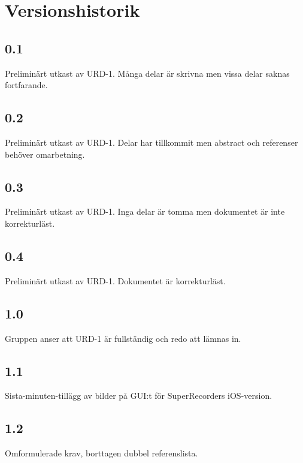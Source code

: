 \section*{Versionshistorik}

\subsection*{0.1}
Preliminärt utkast av URD-1. Många delar är skrivna men vissa delar saknas fortfarande.

\subsection*{0.2}
Preliminärt utkast av URD-1. Delar har tillkommit men abstract och referenser behöver omarbetning.

\subsection*{0.3}
Preliminärt utkast av URD-1. Inga delar är tomma men dokumentet är inte korrekturläst.

\subsection*{0.4}
Preliminärt utkast av URD-1. Dokumentet är korrekturläst.

\subsection*{1.0}
Gruppen anser att URD-1 är fullständig och redo att lämnas in.

\subsection*{1.1}
Sista-minuten-tillägg av bilder på GUI:t för SuperRecorders iOS-version.

\subsection*{1.2}
Omformulerade krav, borttagen dubbel referenslista.
